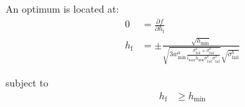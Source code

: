 An optimum is located at:
\begin{align*}
	0 &= \frac{\partial f}{\partial h_\text{f}} \\
	h_\text{f} &= \pm \frac{ \sqrt{  h_\text{min}  }   }{   \sqrt{ 3 w^a_\text{min} \frac{  \sigma^a_\text{fail} + \sigma^b_\text{fail}  }{  l_\text{max}  h_\text{min} \sigma^b_\text{fail} \sigma^a_\text{fail} } }  \sqrt{ \sigma^b_\text{fail}  }  }
\end{align*} 

subject to 
\begin{align}
	h_\text{f} &\ge h_\text{min} \\

\end{align}
